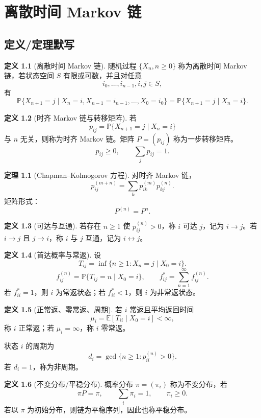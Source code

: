 \documentclass[12pt,a4paper,openany]{ctexrep}
\theoremstyle{definition}
\newtheorem{definition}{定义}[section]
\newtheorem{theorem}{定理}[section]
\newcommand{\E}{\mathbb{E}}
\newcommand{\Pp}{\mathbb{P}}
\begin{document}
\chapter{离散时间 Markov 链}

\section{定义/定理默写}

\begin{definition}[离散时间 Markov 链]
随机过程 $\{X_n,n\ge0\}$ 称为离散时间 Markov 链，若状态空间 $S$ 有限或可数，并且对任意
\[
i_0,\dots,i_{n-1},i,j\in S,
\]
有
\[
\Pp\{X_{n+1}=j\mid X_n=i,X_{n-1}=i_{n-1},\dots,X_0=i_0\}
=
\Pp\{X_{n+1}=j\mid X_n=i\}.
\]
\end{definition}

\begin{definition}[时齐 Markov 链与转移矩阵]
若
\[
p_{ij}=\Pp\{X_{n+1}=j\mid X_n=i\}
\]
与 $n$ 无关，则称为时齐 Markov 链。矩阵 $P=(p_{ij})$ 称为一步转移矩阵。
\[
p_{ij}\ge0,\qquad \sum_jp_{ij}=1.
\]
\end{definition}

\begin{theorem}[Chapman--Kolmogorov 方程]
对时齐 Markov 链，
\[
p_{ij}^{(m+n)}=\sum_k p_{ik}^{(m)}p_{kj}^{(n)}.
\]
矩阵形式：
\[
P^{(n)}=P^n.
\]
\end{theorem}

\begin{definition}[可达与互通]
若存在 $n\ge1$ 使 $p_{ij}^{(n)}>0$，称 $i$ 可达 $j$，记为 $i\to j$。若 $i\to j$ 且 $j\to i$，称 $i$ 与 $j$ 互通，记为 $i\leftrightarrow j$。
\end{definition}

\begin{definition}[首达概率与常返]
设
\[
T_{ij}=\inf\{n\ge1:X_n=j\mid X_0=i\}.
\]
\[
f_{ij}^{(n)}=\Pp\{T_{ij}=n\mid X_0=i\},\qquad
f_{ij}^*=\sum_{n=1}^{\infty}f_{ij}^{(n)}.
\]
若 $f_{ii}^*=1$，则 $i$ 为常返状态；若 $f_{ii}^*<1$，则 $i$ 为非常返状态。
\end{definition}

\begin{definition}[正常返、零常返、周期]
若 $i$ 常返且平均返回时间
\[
\mu_i=\E[T_{ii}\mid X_0=i]<\infty,
\]
称 $i$ 正常返；若 $\mu_i=\infty$，称 $i$ 零常返。

状态 $i$ 的周期为
\[
d_i=\gcd\{n\ge1:p_{ii}^{(n)}>0\}.
\]
若 $d_i=1$，称为非周期。
\end{definition}

\begin{definition}[不变分布/平稳分布]
概率分布 $\pi=(\pi_i)$ 称为不变分布，若
\[
\pi P=\pi,\qquad \sum_i\pi_i=1,\qquad \pi_i\ge0.
\]
若以 $\pi$ 为初始分布，则链为平稳序列，因此也称平稳分布。
\end{definition}
\end{document}
